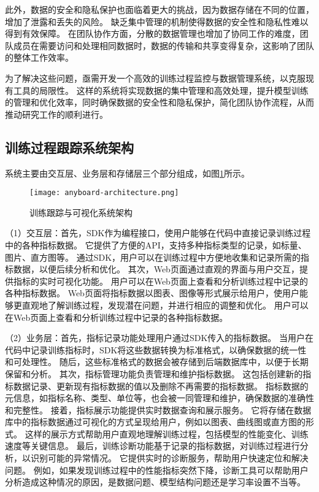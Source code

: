 此外，数据的安全和隐私保护也面临着更大的挑战，因为数据存储在不同的位置，增加了泄露和丢失的风险。
缺乏集中管理的机制使得数据的安全性和隐私性难以得到有效保障。
在团队协作方面，分散的数据管理也增加了协同工作的难度，团队成员在需要访问和处理相同数据时，数据的传输和共享变得复杂，这影响了团队的整体工作效率。

为了解决这些问题，亟需开发一个高效的训练过程监控与数据管理系统，以克服现有工具的局限性。
这样的系统将实现数据的集中管理和高效处理，提升模型训练的管理和优化效率，同时确保数据的安全性和隐私保护，简化团队协作流程，从而推动研究工作的顺利进行。

\subsection{训练过程跟踪系统架构}

系统主要由交互层、业务层和存储层三个部分组成，如图\ref{fig:anyboardarch}所示。

\begin{figure}
  \centering
  \texttt{[image: anyboard-architecture.png]}
  \caption{训练跟踪与可视化系统架构}
  \label{fig:anyboardarch}
\end{figure}

（1）交互层：首先，SDK作为编程接口，使用户能够在代码中直接记录训练过程中的各种指标数据。
它提供了方便的API，支持多种指标类型的记录，如标量、图片、直方图等。
通过SDK，用户可以在训练过程中方便地收集和记录所需的指标数据，以便后续分析和优化。
其次，Web页面通过直观的界面与用户交互，提供指标的实时可视化功能。
用户可以在Web页面上查看和分析训练过程中记录的各种指标数据。
Web页面将指标数据以图表、图像等形式展示给用户，使用户能够更直观地了解训练过程，发现潜在问题，并进行相应的调整和优化。
用户可以在Web页面上查看和分析训练过程中记录的各种指标数据。

（2）业务层：首先，指标记录功能处理用户通过SDK传入的指标数据。
当用户在代码中记录训练指标时，SDK将这些数据转换为标准格式，以确保数据的统一性和可处理性。
随后，这些标准格式的数据会被存储到后端数据库中，以便于长期保留和分析。
其次，指标管理功能负责管理和维护指标数据。
这包括创建新的指标数据记录、更新现有指标数据的值以及删除不再需要的指标数据。
指标数据的元信息，如指标名称、类型、单位等，也会被一同管理和维护，确保数据的准确性和完整性。
接着，指标展示功能提供实时数据查询和展示服务。
它将存储在数据库中的指标数据通过可视化的方式呈现给用户，例如以图表、曲线图或直方图的形式。
这样的展示方式帮助用户直观地理解训练过程，包括模型的性能变化、训练速度等关键信息。
最后，训练诊断功能基于记录的指标数据，对训练过程进行分析，以识别可能的异常情况。
它提供实时的诊断服务，帮助用户快速定位和解决问题。
例如，如果发现训练过程中的性能指标突然下降，诊断工具可以帮助用户分析造成这种情况的原因，是数据问题、模型结构问题还是学习率设置不当等。


